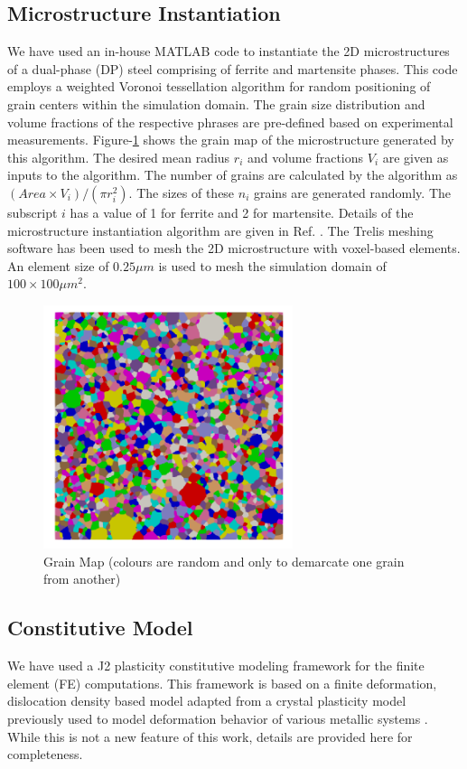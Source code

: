 \subsection{Microstructure Instantiation}
We have used an in-house MATLAB code to instantiate the 2D microstructures of a dual-phase (DP) steel comprising of ferrite and martensite phases. This code employs a weighted Voronoi tessellation algorithm for random positioning of grain centers within the simulation domain. The grain size distribution and volume fractions of the respective phrases are pre-defined based on experimental measurements. Figure-\ref{fig:grain-trans} shows the grain map of the microstructure generated by this algorithm. The desired mean radius $r_i$ and  volume fractions $V_i$ are given as inputs to the algorithm. The number of grains are calculated by the algorithm as $(Area\times V_i)/(\pi r_i^2)$. The sizes of these $n_i$ grains are generated randomly. The subscript $i$ has a value of 1 for ferrite and 2 for martensite. Details of the microstructure instantiation algorithm are given in Ref.  \cite{patra2015modeling}. The Trelis meshing software has been used to mesh the 2D microstructure with voxel-based elements. An element size of $0.25 \mu m$ is used to mesh the simulation domain of $100\times100 \mu m^2$.
\begin{figure}[!h]
	\centering
	\includegraphics[width=0.65\textwidth]{Pictures/grain-trans.png}
	\hspace{1mm}
	\caption{Grain Map (colours are random and only to demarcate one grain from another)} 
	\label{fig:grain-trans}
\end{figure}
\subsection{Constitutive Model}
We have used a J2 plasticity constitutive modeling framework for the finite element (FE) computations. This framework is based on a finite deformation, dislocation density based model adapted from a crystal plasticity model previously used to model deformation behavior of various metallic systems \cite{POKHAREL2019201} \cite{THOOL2020102785}. While this is not a new feature of this work, details are provided here for completeness. 

